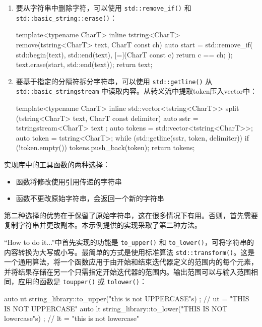 \begin{enumerate}
\item
要从字符串中删除字符，可以使用 \verb|std::remove_if()| 和 \verb|std::basic_string::erase()|：

\begin{cpp}
template<typename CharT>
inline tstring<CharT> remove(tstring<CharT> text,
CharT const ch)
{
    auto start = std::remove_if(
                    std::begin(text), std::end(text),
                    [=](CharT const c) {return c == ch; });
    text.erase(start, std::end(text));
    return text;
}
\end{cpp}

\item
要基于指定的分隔符拆分字符串，可以使用 \verb|std::getline()| 从 \verb|std::basic_stringstream| 中读取内容。从转义流中提取token压入vector中：

\begin{cpp}
template<typename CharT>
inline std::vector<tstring<CharT>> split
(tstring<CharT> text, CharT const delimiter)
{
    auto sstr = tstringstream<CharT>{ text };
    auto tokens = std::vector<tstring<CharT>>{};
    auto token = tstring<CharT>{};
    while (std::getline(sstr, token, delimiter))
    {
        if (!token.empty()) tokens.push_back(token);
    }
    return tokens;
}
\end{cpp}
\end{enumerate}


实现库中的工具函数的两种选择：

\begin{itemize}
\item
函数将修改使用引用传递的字符串

\item
函数不更改原始字符串，会返回一个新的字符串
\end{itemize}

第二种选择的优势在于保留了原始字符串，这在很多情况下有用。否则，首先需要复制字符串并更改副本。本示例提供的实现采取了第二种方法。

“How to do it...”中首先实现的功能是 \verb|to_upper()| 和 \verb|to_lower()|，可将字符串的内容转换为大写或小写。最简单的方式是使用标准算法 \verb|std::transform()|。这是一个通用算法，将一个函数应用于由开始和结束迭代器定义的范围内的每个元素，并将结果存储在另一个只需指定开始迭代器的范围内。输出范围可以与输入范围相同，应用的函数是 \verb|toupper()| 或 \verb|tolower()|：

\begin{cpp}
auto ut{ string_library::to_upper("this is not UPPERCASE"s) };
// ut = "THIS IS NOT UPPERCASE"
auto lt{ string_library::to_lower("THIS IS NOT lowercase"s) };
// lt = "this is not lowercase"
\end{cpp}

